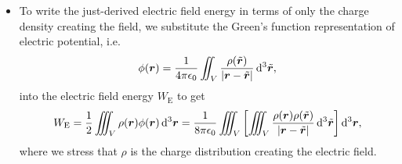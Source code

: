 \documentclass[11pt, a4paper]{article}
\newcommand{\diff}{\mathop{}\!\mathrm{d}} %
\newcommand{\dr}{\diff^{3} \r}  %
\newcommand{\dtr}{\diff^{3} \tilde{\r}}  %
\renewcommand{\vec}[1]{\bm{#1}} %
\renewcommand{\t}[1]{\tilde{#1}} %
\renewcommand{\r}{\vec{r}}
\newcommand{\ee}{\epsilon_{0}}  %
\begin{document}
\begin{itemize}
	\item To write the just-derived electric field energy in terms of only the charge density creating the field, we substitute the Green's function representation of electric potential, i.e.
	\begin{equation*}
		\phi(\r) = \frac{1}{4\pi \ee}\iint_{V} \frac{\rho(\t{\r})}{\abs{\r - \t{\r}}} \dtr,
	\end{equation*}
	into the electric field energy $ W_{\text{E}} $ to get
	\begin{equation*}
		W_{\text{E}} = \frac{1}{2} \iiint_{V} \rho(\r) \phi(\r) \dr = \frac{1}{8 \pi \ee} \iiint_{V} \left[\iiint_{V} \frac{\rho(\r) \rho(\t{\r})}{\abs{\r - \t{\r}}} \dtr\right] \dr,
	\end{equation*}
	where we stress that $ \rho $ is the charge distribution creating the electric field.
\end{itemize}
\end{document}
